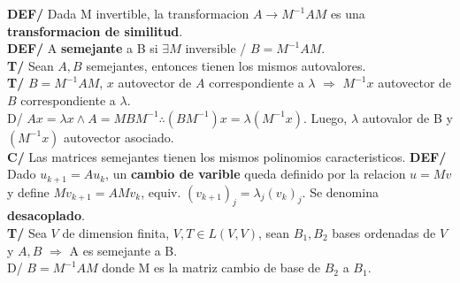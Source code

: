 \documentclass[10pt,a4paper]{article}
\begin{document}
\textbf{DEF/} Dada M invertible, la transformacion $A \rightarrow M^{-1}AM$ es una \textbf{transformacion de similitud}.\\
\textbf{DEF/ }A \textbf{semejante} a B si $\exists M$ inversible / $B = M^{-1}AM$.\\
\textbf{T/} Sean $A,B$ semejantes, entonces tienen los mismos autovalores.\\
\textbf{T/} $B = M^{-1}AM$, $x$ autovector de $A$ correspondiente a $\lambda$ $\Rightarrow$ $M^{-1}x$ autovector de $B$ correspondiente a $\lambda$.\\
D/ $Ax=\lambda x \land A = MBM^{-1} \therefore (BM^{-1})x = \lambda (M^{-1}x)$. Luego, $\lambda$ autovalor de B y $(M^{-1}x)$ autovector asociado.\\
\textbf{C/} Las matrices semejantes tienen los mismos polinomios caracteristicos.
\textbf{DEF/} Dado $u_{k+1} = Au_k$, un \textbf{cambio de varible} queda definido por la relacion $u=Mv$ y define $Mv_{k+1}=AMv_k$, equiv. $(v_{k+1})_j = \lambda_j (v_k)_j$. Se denomina \textbf{desacoplado}.\\
\textbf{T/} Sea $V$ de dimension finita, $V,T \in L(V,V)$, sean $B_1, B_2$ bases ordenadas de $V$ y $A,B$ $\Rightarrow$ A es semejante a B.\\
D/ $B = M^{-1}AM$ donde M es la matriz cambio de base de $B_2$ a $B_1$.

\dotfill
\end{document}

